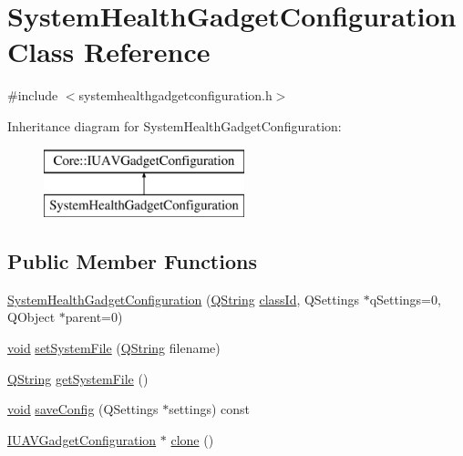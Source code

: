 \hypertarget{class_system_health_gadget_configuration}{\section{\-System\-Health\-Gadget\-Configuration \-Class \-Reference}
\label{class_system_health_gadget_configuration}
}


{\ttfamily \#include $<$systemhealthgadgetconfiguration.\-h$>$}

\-Inheritance diagram for \-System\-Health\-Gadget\-Configuration\-:\begin{figure}[H]
\begin{center}
\leavevmode
\includegraphics[height=2.000000cm]{class_system_health_gadget_configuration}
\end{center}
\end{figure}
\subsection*{\-Public \-Member \-Functions}
\begin{DoxyCompactItemize}
\item 
\hyperlink{group___system_health_plugin_gae6898d57714b4d34fc5ddc5e47e3af2e}{\-System\-Health\-Gadget\-Configuration} (\hyperlink{group___u_a_v_objects_plugin_gab9d252f49c333c94a72f97ce3105a32d}{\-Q\-String} \hyperlink{group___core_plugin_gac953657221ba7fda967ada0408332641}{class\-Id}, \-Q\-Settings $\ast$q\-Settings=0, \-Q\-Object $\ast$parent=0)
\item 
\hyperlink{group___u_a_v_objects_plugin_ga444cf2ff3f0ecbe028adce838d373f5c}{void} \hyperlink{group___system_health_plugin_gae877ad975152eb4b4df1076138610d0e}{set\-System\-File} (\hyperlink{group___u_a_v_objects_plugin_gab9d252f49c333c94a72f97ce3105a32d}{\-Q\-String} filename)
\item 
\hyperlink{group___u_a_v_objects_plugin_gab9d252f49c333c94a72f97ce3105a32d}{\-Q\-String} \hyperlink{group___system_health_plugin_ga4807e799ef6d19b807497d0c74295b32}{get\-System\-File} ()
\item 
\hyperlink{group___u_a_v_objects_plugin_ga444cf2ff3f0ecbe028adce838d373f5c}{void} \hyperlink{group___system_health_plugin_gabbb3ed58da74764c327a4933fbc81a53}{save\-Config} (\-Q\-Settings $\ast$settings) const 
\item 
\hyperlink{group___core_plugin_gacdfdf0b1e39b5002472b76b6564ce51f}{\-I\-U\-A\-V\-Gadget\-Configuration} $\ast$ \hyperlink{group___system_health_plugin_gaec4d54c2f539b5bbead55affc7dd496c}{clone} ()
\end{DoxyCompactItemize}


